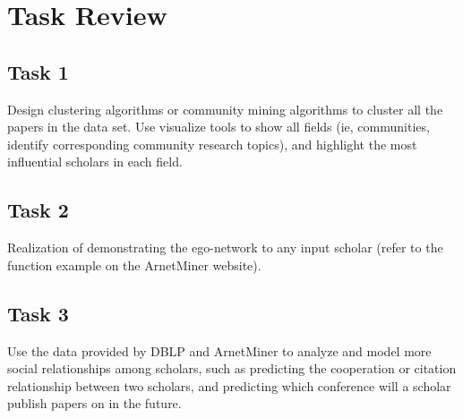 \documentclass[conference]{IEEEtran}
\begin{document}




\maketitle






%
\IEEEpeerreviewmaketitle
\section{Task Review}
\subsection{Task 1}
Design clustering algorithms or community mining algorithms to cluster all the papers in the data set. Use visualize tools to show all fields (ie, communities, identify corresponding community research topics), and highlight the most influential scholars in each field.
\subsection{Task 2}
Realization of demonstrating the ego-network to any input scholar (refer to the function example on the ArnetMiner website).
\subsection{Task 3}
Use the data provided by DBLP and ArnetMiner to analyze and model more social relationships among scholars, such as predicting the cooperation or citation relationship between two scholars, and predicting which conference will a scholar publish papers on in the future.
\end{document}
